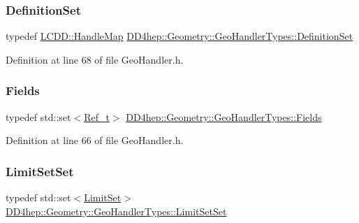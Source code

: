 \subsubsection{\texorpdfstring{Definition\+Set}{DefinitionSet}}
{\footnotesize\ttfamily typedef \hyperlink{class_d_d4hep_1_1_geometry_1_1_l_c_d_d_a05cb11e7355772c7b0794bcca59bf477}{L\+C\+D\+D\+::\+Handle\+Map} \hyperlink{class_d_d4hep_1_1_geometry_1_1_geo_handler_types_a960cd930e1a491fc9a6afa5058865b4e}{D\+D4hep\+::\+Geometry\+::\+Geo\+Handler\+Types\+::\+Definition\+Set}}



Definition at line 68 of file Geo\+Handler.\+h.

\hypertarget{class_d_d4hep_1_1_geometry_1_1_geo_handler_types_ac82df292e19cfb74015cb798e54620b4}{}\label{class_d_d4hep_1_1_geometry_1_1_geo_handler_types_ac82df292e19cfb74015cb798e54620b4} 
\subsubsection{\texorpdfstring{Fields}{Fields}}
{\footnotesize\ttfamily typedef std\+::set$<$\hyperlink{group___d_d4_h_e_p___g_e_o_m_e_t_r_y_ga40af83be6718bb8828a3d83dc7f8c930}{Ref\+\_\+t}$>$ \hyperlink{class_d_d4hep_1_1_geometry_1_1_geo_handler_types_ac82df292e19cfb74015cb798e54620b4}{D\+D4hep\+::\+Geometry\+::\+Geo\+Handler\+Types\+::\+Fields}}



Definition at line 66 of file Geo\+Handler.\+h.

\hypertarget{class_d_d4hep_1_1_geometry_1_1_geo_handler_types_ae93bccfaccdbc36f0f5339c24aada447}{}\label{class_d_d4hep_1_1_geometry_1_1_geo_handler_types_ae93bccfaccdbc36f0f5339c24aada447} 
\subsubsection{\texorpdfstring{Limit\+Set\+Set}{LimitSetSet}}
{\footnotesize\ttfamily typedef std\+::set$<$\hyperlink{class_d_d4hep_1_1_geometry_1_1_limit_set}{Limit\+Set}$>$ \hyperlink{class_d_d4hep_1_1_geometry_1_1_geo_handler_types_ae93bccfaccdbc36f0f5339c24aada447}{D\+D4hep\+::\+Geometry\+::\+Geo\+Handler\+Types\+::\+Limit\+Set\+Set}}



